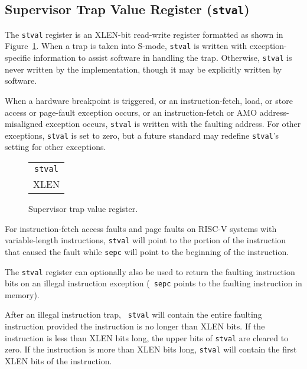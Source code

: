 \subsection{Supervisor Trap Value Register
(\texttt{stval})}\label{supervisor-trap-value-register-sbadaddr}

The \texttt{stval} register is an XLEN-bit read-write register formatted as shown
in Figure~\ref{fig:stval}.  When a trap is taken into S-mode, \texttt{stval} is
written with exception-specific information to assist software in handling the
trap.  Otherwise, \texttt{stval} is never written by the implementation, though
it may be explicitly written by software.

When a hardware breakpoint is triggered, or
an instruction-fetch, load, or store access or page-fault exception occurs,
or an instruction-fetch or AMO address-misaligned exception occurs,
\texttt{stval} is written with the faulting address.
For other exceptions, \texttt{stval} is
set to zero, but a future standard may redefine \texttt{stval}'s setting for
other exceptions.

\ifdefined\MARKDOWN
\else

\begin{figure}[!ht]
	{\footnotesize
		\begin{center}
			\begin{tabular}{@{}J}
				 \\
				\hline
				 \\
				\hline
				XLEN \\
			\end{tabular}
		\end{center}
	}
	\vspace{-0.1in}
	\caption{Supervisor trap value register.}
	\label{fig:stval}
\end{figure}

\fi

For instruction-fetch access faults and page faults on RISC-V systems with
variable-length instructions, \texttt{stval} will point to the portion
of the instruction that caused the fault while \texttt{sepc} will point
to the beginning of the instruction.

The \texttt{stval} register can optionally also be used to return the
faulting instruction bits on an illegal instruction exception ({\tt
  sepc} points to the faulting instruction in memory).

After an illegal instruction trap, {\tt
  stval} will contain the entire faulting instruction provided the
instruction is no longer than XLEN bits.  If the instruction is less
than XLEN bits long, the upper bits of \texttt{stval} are cleared to
zero. If the instruction is more than XLEN bits long, \texttt{stval}
will contain the first XLEN bits of the instruction.

